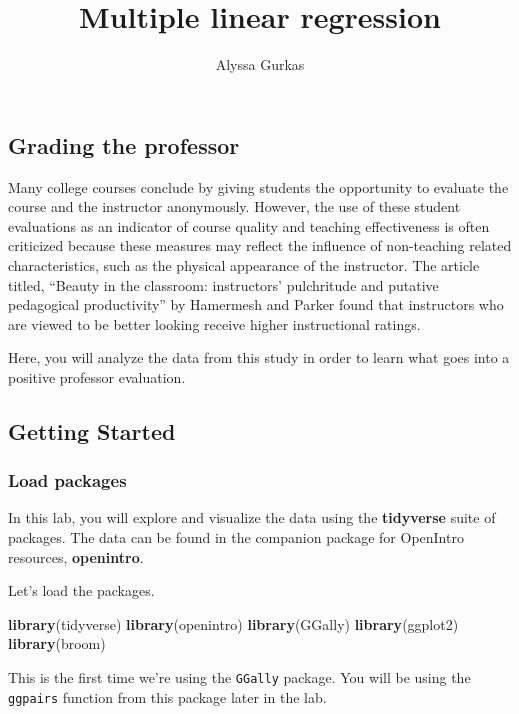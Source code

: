 \documentclass[
]{article}
\title{Multiple linear regression}
\author{Alyssa Gurkas}
\date{}
\newenvironment{Shaded}{\begin{snugshade}}{\end{snugshade}}
\newcommand{\FunctionTok}[1]{\textcolor[rgb]{0.13,0.29,0.53}{\textbf{#1}}}
\newcommand{\NormalTok}[1]{#1}
\begin{document}
\maketitle

\subsection{Grading the professor}\label{grading-the-professor}

Many college courses conclude by giving students the opportunity to
evaluate the course and the instructor anonymously. However, the use of
these student evaluations as an indicator of course quality and teaching
effectiveness is often criticized because these measures may reflect the
influence of non-teaching related characteristics, such as the physical
appearance of the instructor. The article titled, ``Beauty in the
classroom: instructors' pulchritude and putative pedagogical
productivity'' by Hamermesh and Parker found that instructors who are
viewed to be better looking receive higher instructional ratings.

Here, you will analyze the data from this study in order to learn what
goes into a positive professor evaluation.

\subsection{Getting Started}\label{getting-started}

\subsubsection{Load packages}\label{load-packages}

In this lab, you will explore and visualize the data using the
\textbf{tidyverse} suite of packages. The data can be found in the
companion package for OpenIntro resources, \textbf{openintro}.

Let's load the packages.

\begin{Shaded}
\begin{Highlighting}[]
\FunctionTok{library}\NormalTok{(tidyverse)}
\FunctionTok{library}\NormalTok{(openintro)}
\FunctionTok{library}\NormalTok{(GGally)}
\FunctionTok{library}\NormalTok{(ggplot2)}
\FunctionTok{library}\NormalTok{(broom)}
\end{Highlighting}
\end{Shaded}

This is the first time we're using the \texttt{GGally} package. You will
be using the \texttt{ggpairs} function from this package later in the
lab.
\end{document}
